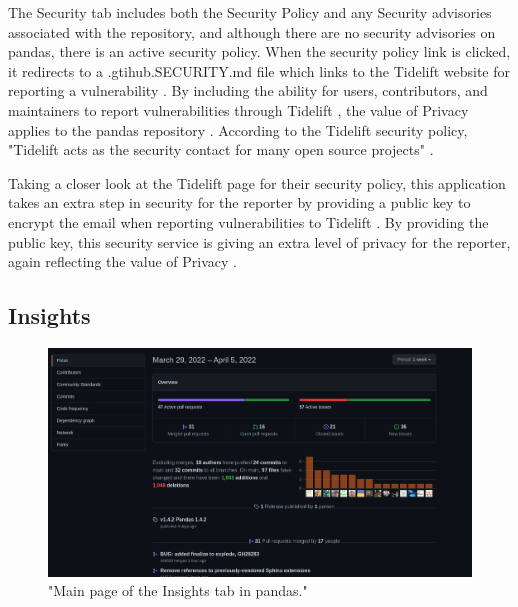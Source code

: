 The Security tab includes both the Security Policy and any Security advisories associated with the repository, and although there are no security advisories on pandas, there is an active security policy\cite{pandasrepo}. When the security policy link is clicked, it redirects to a .gtihub.SECURITY.md file which links to the Tidelift website for reporting a vulnerability \cite{pandasrepo}. By including the ability for users, contributors, and maintainers to report vulnerabilities through Tidelift , the value of Privacy applies to the pandas repository \cite{gorman2000values}. According to the Tidelift security policy, "Tidelift acts as the security contact for many open source projects" \cite{tideliftpolicy}.

Taking a closer look at the Tidelift page for their security policy, this application takes an extra step in security for the reporter by providing a public key to encrypt the email when reporting vulnerabilities to Tidelift \cite{tideliftpolicy}. By providing the public key, this security service is giving an extra level of privacy for the reporter, again reflecting the value of Privacy \cite{gorman2000values}. 

\subsection{Insights}

\begin{figure}[hbt!]
\begin{center}
\includegraphics[width=.8\textwidth]{./images/insights.png}
\caption{"Main page of the Insights tab in pandas."}
\vspace{0in}
\end{center}
\end{figure}


